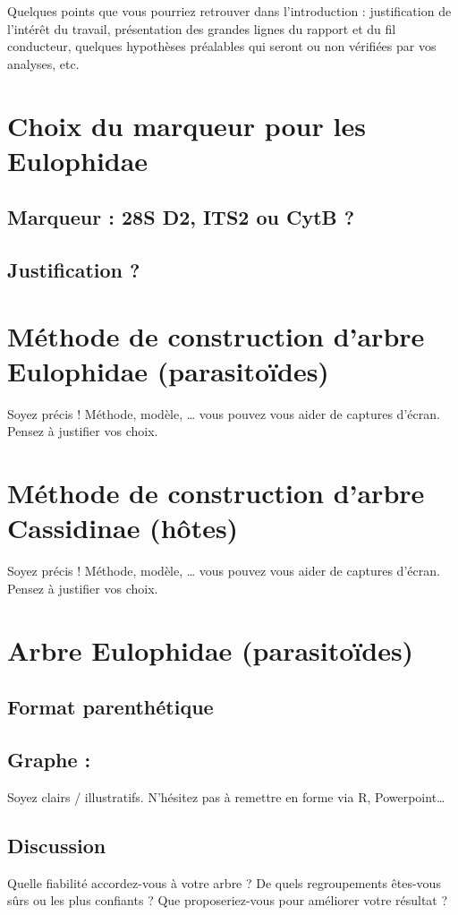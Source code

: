 \documentclass[a4paper, 11pt]{article}
\begin{document}
Quelques points que vous pourriez retrouver dans l’introduction : justification de l’intérêt du travail, présentation des grandes lignes du rapport et du fil conducteur, quelques hypothèses préalables qui seront ou non vérifiées par vos analyses, etc.

\section{Choix du marqueur pour les Eulophidae}

\subsection{Marqueur : 28S D2, ITS2 ou CytB ?} 

\subsection{Justification ?}

\section{Méthode de construction d'arbre Eulophidae (parasitoïdes)}

Soyez précis ! Méthode, modèle, … vous pouvez vous aider de captures d’écran. Pensez à justifier vos choix.

\section{Méthode de construction d'arbre Cassidinae (hôtes)}

Soyez précis ! Méthode, modèle, … vous pouvez vous aider de captures d’écran. Pensez à justifier vos choix.

\section{Arbre Eulophidae (parasitoïdes)}
\subsection{Format parenthétique} 


\subsection{Graphe :}
Soyez clairs / illustratifs. N’hésitez pas à remettre en forme via R, Powerpoint…

\subsection{Discussion}
Quelle fiabilité accordez-vous à votre arbre ? De quels regroupements êtes-vous sûrs ou les plus confiants ? Que proposeriez-vous pour améliorer votre résultat ?
\end{document}
